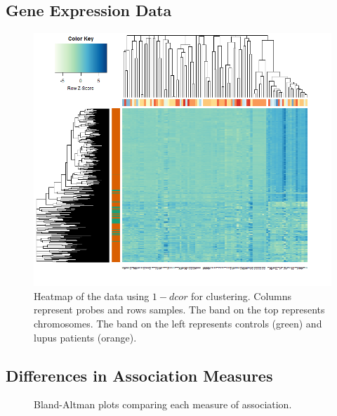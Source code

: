 \documentclass[a4paper, landscape, 20pt]{extreport}
\begin{document}
\subsection*{\color{Blue} Gene Expression Data}
\begin{figure}[H]
	\begin{center}
		\includegraphics[width=12cm]{heat3}
\caption{Heatmap of the data using $1 - dcor$ for clustering. Columns represent probes and rows samples. The band on the top represents chromosomes. The band on the left represents controls (green) and lupus patients (orange).}
	\end{center}
\end{figure}

\newpage

\newpage
\subsection*{\color{Blue} Differences in Association Measures}

\begin{figure}[H]
    \centering
    \qquad
    \caption{Bland-Altman plots comparing each measure of association.}
\end{figure}
\end{document}
